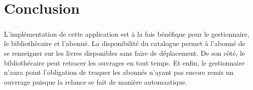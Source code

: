\chapter{Conclusion}
\paragraph{}
L'implémentation de cette application est à la fois bénéfique pour le gestionnaire,
le bibliothécaire et l'abonné. La disponibilité du catalogue permet à l'abonné de 
se renseigner sur les livres disponibles sans faire de déplacement. De son côté, le 
bibliothécaire peut retracer les ouvrages en tout temps. Et enfin, le gestionnaire n'aura 
point l'obligation de traquer les abonnés n'ayant pas encore remis un ouvrrage
puisque la relance se fait de manière automaatique.   